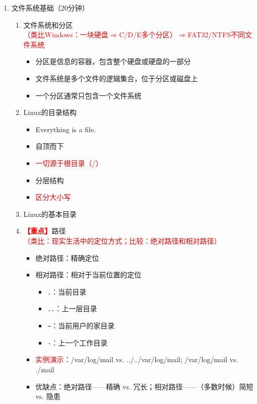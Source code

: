 \documentclass{TIJMUjiaoanLL}
\begin{document}
\begin{enumerate}
  \item 文件系统基础（20分钟）
    \begin{enumerate}
      \item 文件系统和分区\\
      \textcolor{red}{（类比Windows：一块硬盘$\Rightarrow$C/D/E多个分区）$\Rightarrow$FAT32/NTFS不同文件系统}
	\begin{itemize}
	  \item 分区是信息的容器，包含整个硬盘或硬盘的一部分
          \item 文件系统是多个文件的逻辑集合，位于分区或磁盘上
          \item 一个分区通常只包含一个文件系统
	\end{itemize}
      \item Linux的目录结构
        \begin{itemize}
          \item Everything is a file.
          \item 自顶而下
          \item \textcolor{red}{一切源于根目录（/）}
          \item 分层结构
          \item \textcolor{red}{区分大小写}
        \end{itemize}
      \item Linux的基本目录
      \item \textcolor{red}{\textbf{【重点】}}路径\\
	\textcolor{red}{（类比：现实生活中的定位方式；比较：绝对路径和相对路径）}
	\begin{itemize}
	  \item 绝对路径：精确定位
	  \item 相对路径：相对于当前位置的定位
	    \vspace*{-10pt}
            \begin{multicols}{2}
	    \begin{itemize}
              \item \verb|.|：当前目录
              \item \verb|..|：上一层目录
              \item \verb|~|：当前用户的家目录
              \item \verb|-|：上一个工作目录
	    \end{itemize}
            \end{multicols}{}
	    \vspace*{-10pt}
	  \item \textcolor{red}{实例演示}：/var/log/mail vs.  ../../var/log/mail; /var/log/mail vs. ./mail
	  \item 优缺点：绝对路径——精确 vs. 冗长；相对路径——（多数时候）简短 vs. 隐患
	\end{itemize}
    \end{enumerate}


\end{enumerate}
\end{document}
